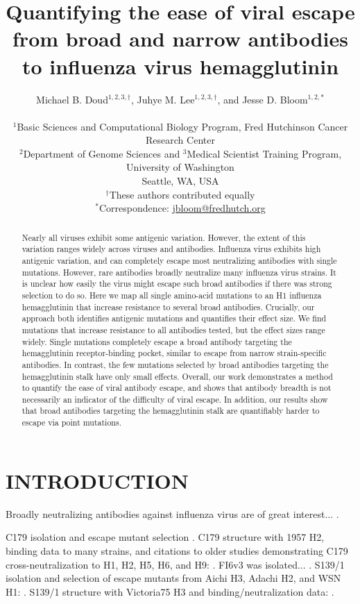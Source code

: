 \documentclass[11pt]{article}
\title{Quantifying the ease of viral escape from broad and narrow antibodies to influenza virus hemagglutinin}
\author
{Michael B. Doud$^{1,2,3,\dagger}$, Juhye M. Lee$^{1,2,3,\dagger}$, and Jesse D. Bloom$^{1,2,*}$\\
\\
\scriptsize{$^1$Basic Sciences and Computational Biology Program, Fred Hutchinson Cancer Research Center}\\
\scriptsize{$^2$Department of Genome Sciences and $^3$Medical Scientist Training Program, University of Washington} \\
\scriptsize{Seattle, WA, USA} \\
\scriptsize{$^{\dagger}$These authors contributed equally} \\
\scriptsize{$^*$Correspondence: \href{jbloom@fredhutch.org}{jbloom@fredhutch.org}}
}
\date{}
\begin{document}
\maketitle
\onehalfspacing

\begin{abstract}
Nearly all viruses exhibit some antigenic variation.
However, the extent of this variation ranges widely across viruses and antibodies.
Influenza virus exhibits high antigenic variation, and can completely escape most neutralizing antibodies with single mutations.
However, rare antibodies broadly neutralize many influenza virus strains.
It is unclear how easily the virus might escape such broad antibodies if there was strong selection to do so.
Here we map all single amino-acid mutations to an H1 influenza hemagglutinin that increase resistance to several broad antibodies.
Crucially, our approach both identifies antigenic mutations and quantifies their effect size.
We find mutations that increase resistance to all antibodies tested, but the effect sizes range widely. 
Single mutations completely escape a broad antibody targeting the hemagglutinin receptor-binding pocket, similar to escape from narrow strain-specific antibodies.   
In contrast, the few mutations selected by broad antibodies targeting the hemagglutinin stalk have only small effects. 
Overall, our work demonstrates a method to quantify the ease of viral antibody escape, and shows that antibody breadth is not necessarily an indicator of the difficulty of viral escape.
In addition, our results show that broad antibodies targeting the hemagglutinin stalk are quantifiably harder to escape via point mutations.
\end{abstract}

\section*{INTRODUCTION}
Broadly neutralizing antibodies against influenza virus are of great interest... \cite{corti2017tackling}. 

C179 isolation and escape mutant selection \cite{okuno1993common}.
C179 structure with 1957 H2, binding data to many strains, and citations to older studies demonstrating C179 cross-neutralization to H1, H2, H5, H6, and H9:  \cite{dreyfus2013structure}.
FI6v3 was isolated... \cite{corti2011neutralizing}.
S139/1 isolation and selection of escape mutants from Aichi H3, Adachi H2, and WSN H1: \cite{yoshida2009cross}.
S139/1 structure with Victoria75 H3 and binding/neutralization data: \cite{lee2012heterosubtypic}.
\end{document}
